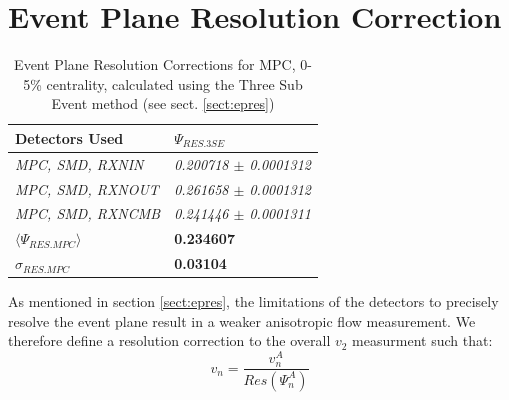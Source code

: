 \section{Event Plane Resolution Correction}
\label{secteperr}
\begin{table}[htbp!]
\centering
\caption[Event Plane Resolution Corrections for MPC, 0-5\% centrality]{Event Plane Resolution Corrections for MPC, 0-5\% centrality, calculated using the Three Sub Event method (see sect. \ref{sect:epres})}
\label{EPrestable}
\begin{tabular}{|l|l|}
\hline
\textbf{Detectors Used}     & \textbf{$\Psi_{RES.3SE}$}       \\ \hline
\textit{MPC, SMD, RXNIN}    & \textit{0.200718 $\pm$ 0.0001312} \\ \hline
\textit{MPC, SMD, RXNOUT}   & \textit{0.261658 $\pm$ 0.0001312} \\ \hline
\textit{MPC, SMD, RXNCMB}   & \textit{0.241446 $\pm$ 0.0001311} \\ \hline
\textbf{$\langle\Psi_{RES.MPC}\rangle$}            & \textbf{0.234607}               \\ \hline
\textbf{$\sigma_{RES.MPC}$} & \textbf{0.03104}                \\ \hline
\end{tabular}
\end{table}
As mentioned in section \ref{sect:epres}, the limitations of the detectors to precisely resolve the event plane result in a weaker anisotropic flow measurement. We therefore define a resolution correction to the overall $v_2$ measurment such that:
\begin{equation}
v_n = \frac{v_n^{A}}{Res(\Psi_n^A)}
\end{equation}
